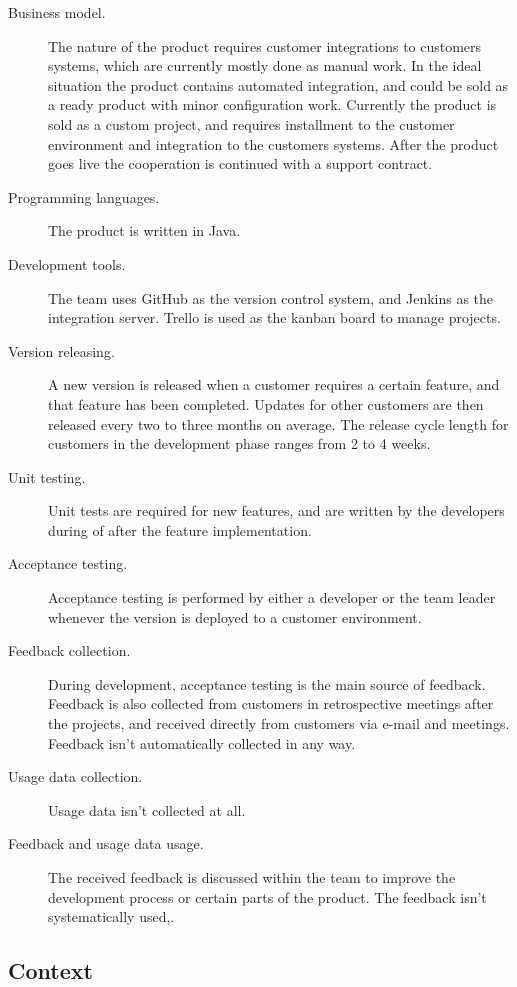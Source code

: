 \documentclass[english, grading]{tktltiki2}
\theoremstyle{definition}
\theoremstyle{remark}
\begin{document}
\begin{description}
  \item[Business model.] The nature of the product requires customer integrations to customers systems, which are currently mostly done as manual work. In the ideal situation the product contains automated integration, and could be sold as a ready product with minor configuration work. Currently the product is sold as a custom project, and requires installment to the customer environment and integration to the customers systems. After the product goes live the cooperation is continued with a support contract.
  \item[Programming languages.] The product is written in Java.
  \item[Development tools.] The team uses GitHub as the version control system, and Jenkins as the integration server. Trello is used as the kanban board to manage projects. 
  \item[Version releasing.] A new version is released when a customer requires a certain feature, and that feature has been completed. Updates for other customers are then released every two to three months on average. The release cycle length for customers in the development phase ranges from 2 to 4 weeks. 
  \item[Unit testing.] Unit tests are required for new features, and are written by the developers during of after the feature implementation.
  \item[Acceptance testing.] Acceptance testing is performed by either a developer or the team leader whenever the version is deployed to a customer environment.
  \item[Feedback collection.] During development, acceptance testing is the main source of feedback. Feedback is also collected from customers in retrospective meetings after the projects, and received directly from customers via e-mail and meetings. Feedback isn't automatically collected in any way.
  \item[Usage data collection.] Usage data isn't collected at all.
  \item[Feedback and usage data usage.] The received feedback is discussed within the team to improve the development process or certain parts of the product. The feedback isn't systematically used,. 
\end{description}

\subsection{Context} %
\end{document}
